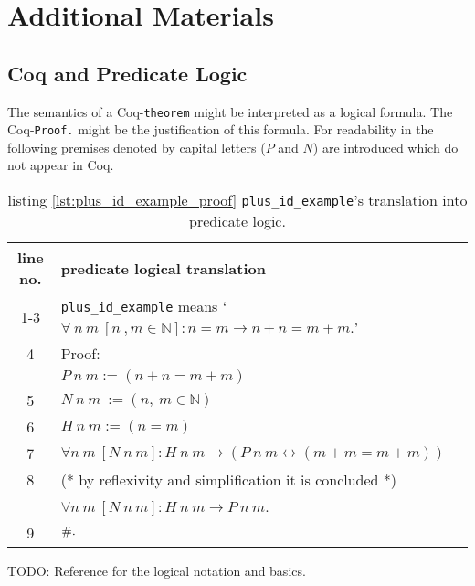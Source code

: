 \section{Additional Materials}
\label{app:AdditionalMaterials}

\subsection{Coq and Predicate Logic} \label{subsec:CoqAndPredicateLogic}
	The semantics of a Coq-\lstinline!theorem! might be interpreted as a logical formula.
	The Coq-\lstinline!Proof.! might be the justification of this formula. 
	For readability in the following premises denoted by capital letters ($P$ and $N$) are introduced which do not appear in Coq.
	\begin{table}[h]
		\begin{center}
			\begin{tabular}{|c|l|}
			    \hline
	 			line no.  &  predicate logical translation \\  \hline
		     	  1-3    %
		                  & \lstinline!plus_id_example! means `$ \forall\ n\ m\ [n\ , m \in \mathbb{N}]: n = m \rightarrow n+n = m+m.$'\\ \hline        
		     	  4       & Proof: \\     	     	      	                      
		                  &   $ P\ n\ m:= (n+n = m+m)$    \\ \hline
		          5       &   $N \ n \ m \ := ( n,\ m \in \mathbb{N})$       \\ \hline       
		          6       &   $ H\ n\ m :=( n= m)$ \\        
		    	      7       &   $ \forall n \ m\ [N \ n\ m]: H\ n\ m \rightarrow (P\ n\ m \leftrightarrow( m+m = m+m))$\\   \hline 
		          8       &   (* by reflexivity and simplification it is concluded *) \\
		                  & $\forall n\ m\ [ N\ n\ m]: H\ n\ m  \rightarrow P\ n\ m$.  \\  \hline
		          9       & $\qed.$\\ \hline        	          
	        		\end{tabular}
		\end{center}
		\label{tab:CoqAndPreciateLogic}
		\caption{listing \ref{lst:plus_id_example_proof} \lstinline!plus_id_example!'s translation into predicate logic.} 
	\end{table}

TODO: Reference for the logical notation and basics.